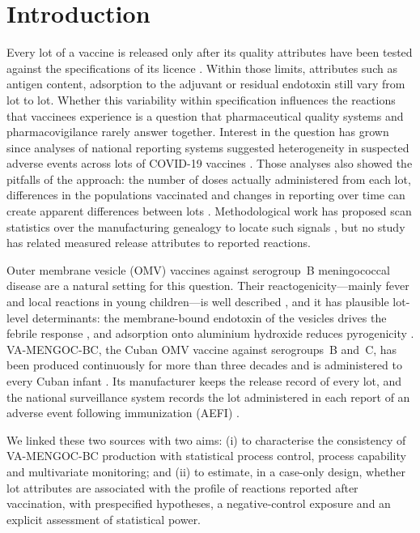 \documentclass[11pt]{article}
\begin{document}
\clearpage
\section{Introduction}\label{sec:intro}

Every lot of a vaccine is released only after its quality attributes have been tested against the
specifications of its licence \cite{WHO2013LotRelease}. Within those limits, attributes such as
antigen content, adsorption to the adjuvant or residual endotoxin still vary from lot to lot. Whether
this variability within specification influences the reactions that vaccinees experience is a
question that pharmaceutical quality systems \cite{ICHQ9R1,ICHQ10} and pharmacovigilance rarely
answer together. Interest in the question has grown since analyses of national reporting systems
suggested heterogeneity in suspected adverse events across lots of COVID-19 vaccines
\cite{Schmeling2023,Manniche2024,Furst2024,Schmeling2025}. Those analyses also showed the pitfalls
of the approach: the number of doses actually administered from each lot, differences in the
populations vaccinated and changes in reporting over time can create apparent differences between
lots \cite{Hviid2023,Scott2023}. Methodological work has proposed scan statistics over the
manufacturing genealogy to locate such signals \cite{Mahaux2019}, but no study has related measured
release attributes to reported reactions.

Outer membrane vesicle (OMV) vaccines against serogroup~B meningococcal disease are a natural
setting for this question. Their reactogenicity---mainly fever and local reactions in young
children---is well described \cite{Nokleby2007,Holst2009}, and it has plausible lot-level
determinants: the membrane-bound endotoxin of the vesicles drives the febrile response
\cite{Sheerin2019,Zariri2016}, and adsorption onto aluminium hydroxide reduces pyrogenicity
\cite{Rosenqvist1998}. VA-MENGOC-BC, the Cuban OMV vaccine against serogroups~B and~C, has been
produced continuously for more than three decades and is administered to every Cuban infant
\cite{Sotolongo2007,SierraGonzalez2019}. Its manufacturer keeps the release record of every lot,
and the national surveillance system records the lot administered in each report of an adverse
event following immunization (AEFI) \cite{Galindo2012}.

We linked these two sources with two aims: (i) to characterise the consistency of VA-MENGOC-BC
production with statistical process control, process capability and multivariate monitoring; and
(ii) to estimate, in a case-only design, whether lot attributes are associated with the profile of
reactions reported after vaccination, with prespecified hypotheses, a negative-control exposure
and an explicit assessment of statistical power.
\end{document}
